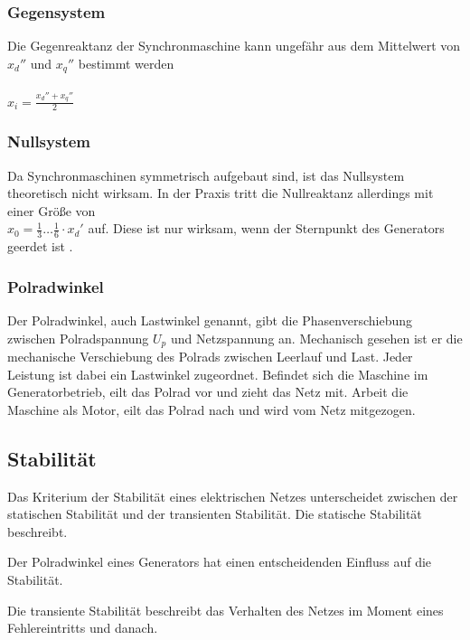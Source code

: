 \documentclass{scrartcl}
\begin{document}
\begin{onehalfspace}
\subsubsection{Gegensystem}
Die Gegenreaktanz der Synchronmaschine kann ungefähr aus dem Mittelwert von $x_d''$ und $x_q''$ bestimmt werden \cite[S. 165]{Funk1962} \\ \\
$x_i = \frac{x_d'' + x_q''}{2}$

\subsubsection{Nullsystem}
Da Synchronmaschinen symmetrisch aufgebaut sind, ist das Nullsystem theoretisch nicht wirksam. In der Praxis tritt die Nullreaktanz allerdings mit einer Größe von \\
$x_0 = \frac{1}{3} … \frac{1}{6} \cdot x_d'$ auf. Diese ist nur wirksam, wenn der Sternpunkt des Generators geerdet ist \cite[S. 166]{Funk1962}.

\subsubsection{Polradwinkel}
Der Polradwinkel, auch Lastwinkel genannt, gibt die Phasenverschiebung zwischen Polradspannung $U_p$ und Netzspannung an. Mechanisch gesehen ist er die mechanische Verschiebung des Polrads zwischen Leerlauf und Last. Jeder Leistung ist dabei ein Lastwinkel zugeordnet. Befindet sich die Maschine im Generatorbetrieb, eilt das Polrad vor und \glqq zieht\grqq{} das Netz mit. Arbeit die Maschine als Motor, eilt das Polrad nach und wird vom Netz \glqq mitgezogen\grqq \cite[S. 187]{Heuck2007}.


\subsection{Stabilität}
Das Kriterium der Stabilität eines elektrischen Netzes unterscheidet zwischen der statischen Stabilität und der transienten Stabilität. Die statische Stabilität beschreibt.

Der Polradwinkel eines Generators hat einen entscheidenden Einfluss auf die Stabilität.

Die transiente Stabilität beschreibt das Verhalten des Netzes im Moment eines Fehlereintritts und danach.


\end{onehalfspace}
\end{document}

